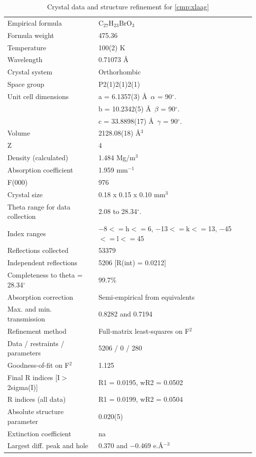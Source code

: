 \pagebreak
\begin{table}[h]
\centering
\caption{Crystal data and structure refinement for \ref{cmp:xlaag}} 
\begin{tabular}{ll} 
\toprule
Empirical formula& 	C$_{27}$H$_{23}$BrO$_3$ \\
Formula weight&	475.36 \\
Temperature &	100(2) K \\
Wavelength& 	0.71073 \AA  \\
Crystal system& 	Orthorhombic \\
Space group& 	P2(1)2(1)2(1) \\
Unit cell dimensions&	a = 6.1357(3) \AA\ $\alpha$ = 90$^\circ$. \\
	&b = 10.2342(5) \AA\	$\beta$ = 90$^\circ$. \\
	&c = 33.8898(17) \AA\	$\gamma$ = 90$^\circ$. \\
Volume&	2128.08(18) \AA$^3$ \\
Z&	4 \\
Density (calculated)&	1.484 Mg/m$^3$ \\
Absorption coefficient&	1.959 mm$^{-1}$ \\
F(000) &	976 \\
Crystal size &	0.18 x 0.15 x 0.10 mm$^3$ \\
Theta range for data collection &	2.08 to 28.34$^\circ$. \\
Index ranges &	$-$8$<=$h$<=$6, $-$13$<=$k$<=$13, $-$45$<=$l$<=$45 \\
Reflections collected &	53379 \\
Independent reflections &	5206 [R(int) = 0.0212] \\
Completeness to theta = 28.34$^\circ$ &	99.7\% \\ 
Absorption correction&	Semi-empirical from equivalents \\
Max. and min. transmission &	0.8282 and 0.7194 \\
Refinement method	&Full-matrix least-squares on F$^2$ \\
Data / restraints / parameters &	 5206 / 0 / 280 \\
Goodness-of-fit on F$^2$ & 	1.125 \\
Final R indices [I$>$2sigma(I)] &	R1 = 0.0195, wR2 = 0.0502 \\
R indices (all data) &	R1 = 0.0199, wR2 = 0.0504 \\
Absolute structure parameter &	0.020(5) \\
Extinction coefficient	& na \\
Largest diff. peak and hole &	0.370 and $-$0.469 e.\AA$^{-3}$ \\
\bottomrule
\end{tabular}
\end{table}

